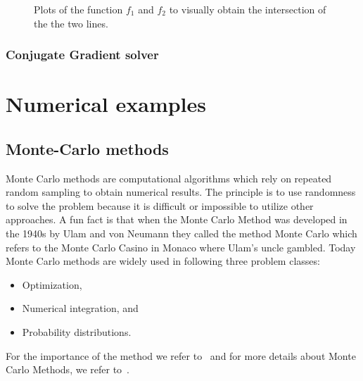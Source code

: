 \documentclass[11pt,fleqn]{book} %
\begin{document}
\begin{figure}[tb]
\centering
{}
\caption{Plots of the function $f_1$ and $f_2$ to visually obtain the intersection of the the two lines.}
\label{fig:example:interesction}
\end{figure}

\section{Conjugate Gradient solver}


\newpage
\theendnotes


\part{Numerical examples}
\label{part:numerical:examples}

\chapter{Monte-Carlo methods}
\label{sec:monte:carlo}
Monte Carlo methods are computational algorithms which rely on repeated random sampling to obtain numerical results. The principle is to use randomness to solve the problem because it is difficult or impossible to utilize other approaches. A fun fact is that when the Monte Carlo Method was developed in the 1940s by Ulam and von Neumann they called the method Monte Carlo which refers to the Monte Carlo Casino in Monaco where Ulam's uncle gambled. Today Monte Carlo methods are widely used in following three problem classes:
\begin{itemize}
\item Optimization,
\item Numerical integration, and
\item Probability distributions.
\end{itemize}
For the importance of the method we refer to~\cite{kroese2014monte} and for more details about Monte Carlo Methods, we refer to~\cite{shonkwiler2009explorations}.\\
\end{document}
